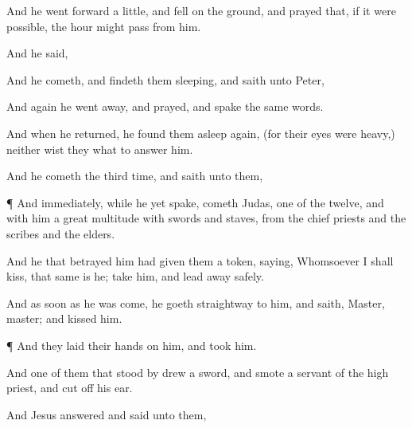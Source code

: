 {And he went
forward a
little, and
fell
on the
ground,
and
prayed
that,
if it
were
possible, the
hour might
pass
from
him.

And he
said,
{}

And he
cometh,
and
findeth
them
sleeping,
and
saith unto
Peter,
{}


And
again he went
away, and
prayed, and
spake the
same
words.

And when he
returned, he
found
them
asleep
again, (for
their
eyes
were
heavy,)
neither wist
they
what to
answer
him.

And he
cometh the third
time,
and
saith unto
them,
{}



\par }{\PP {}¶
And
immediately, while
he
yet
spake,
cometh
Judas,
one of the
twelve,
and
with
him a
great
multitude
with
swords
and
staves,
from the chief
priests
and the
scribes
and the
elders.

And he
that
betrayed
him had
given
them a
token,
saying,
Whomsoever I shall
kiss, that
same is
he;
take
him,
and
lead
{}
away
safely.

And as soon as he was
come, he
goeth
straightway to
him, and
saith,
Master,
master;
and
kissed
him.


\par }{\PP {}¶
And they
laid
their
hands
on
him,
and
took
him.

And
one of them
that stood
by
drew a
sword, and
smote a
servant of the high
priest,
and cut
off
his
ear.

And
Jesus
answered and
said unto
them,
{}


}
